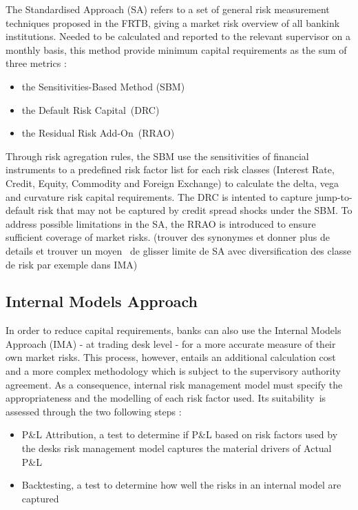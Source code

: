 \documentclass[3pt]{article}
\begin{document}
The Standardised Approach (SA) refers to a set of general risk measurement
techniques proposed in the FRTB, giving a market risk overview of all
bankink institutions. Needed to be calculated and reported to the relevant
supervisor on a monthly basis, this method provide minimum capital
requirements as the sum of three metrics :

\bigskip

\begin{itemize}
\item the Sensitivities-Based Method (SBM)

\item the Default Risk Capital\ (DRC)

\item the Residual Risk Add-On\ (RRAO)
\end{itemize}

\bigskip

Through risk agregation rules, the SBM use the sensitivities of financial
instruments to a predefined risk factor list for each risk classes (Interest
Rate, Credit, Equity, Commodity and Foreign Exchange) to calculate the
delta, vega and curvature risk capital requirements. The DRC is intented to
capture jump-to-default risk that may not be captured by credit spread
shocks under the SBM. To address possible limitations in the SA, the RRAO is
introduced to ensure sufficient coverage of market risks. (trouver des
synonymes et donner plus de details et trouver un moyen \ de glisser limite
de SA avec diversification des classe de risk par exemple dans IMA)

\bigskip 

\subsection{Internal Models Approach}

In order to reduce capital requirements, banks can also use the Internal
Models Approach (IMA) - at trading desk level - for a more accurate measure
of their own market risks. This process, however, entails an additional
calculation cost and a more complex methodology which is subject to the
supervisory authority agreement. As a consequence, internal risk management
model must specify the appropriateness and the modelling of each risk factor
used. Its suitability\ is assessed through the two following steps :

\bigskip 

\begin{itemize}
\item P\&L Attribution, a test to determine if P\&L based on risk factors
used by the desks risk management model captures the material drivers of
Actual P\&L

\item Backtesting, a test to determine how well the risks in an internal
model are captured
\end{itemize}
\end{document}
